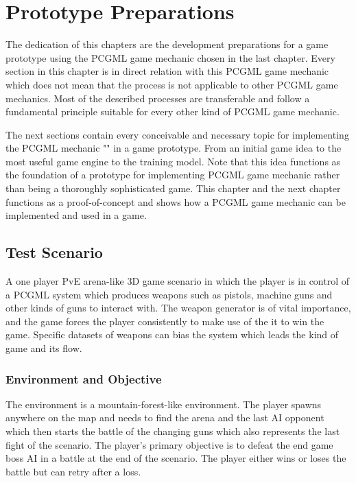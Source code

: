 \documentclass[MGS,Master,english]{twbook}%
\begin{document}
%
%
\clearpage
\chapter{Prototype Preparations} \label{chapter::gamePrototype}
The dedication of this chapters are the development preparations for a game prototype using the PCGML game mechanic chosen in the last chapter. Every section in this chapter is in direct relation with this PCGML game mechanic which does not mean that the process is not applicable to other PCGML game mechanics. Most of the described processes are transferable and follow a fundamental principle suitable for every other kind of PCGML game mechanic. 

The next sections contain every conceivable and necessary topic for implementing the PCGML mechanic "" in a game prototype. From an initial game idea to the most useful game engine to the training model. Note that this idea functions as the foundation of a prototype for implementing PCGML game mechanic rather than being a thoroughly sophisticated game. This chapter and the next chapter functions as a proof-of-concept and shows how a PCGML game mechanic can be implemented and used in a game.

\section{Test Scenario}
A one player \ac{PvE} arena-like 3D game scenario in which the player is in control of a PCGML system which produces weapons such as pistols, machine guns and other kinds of guns to interact with. The weapon generator is of vital importance, and the game forces the player consistently to make use of the it to win the game. Specific datasets of weapons can bias the system which leads the kind of game and its flow. 

\subsection{Environment and Objective}
The environment is a mountain-forest-like environment. The player spawns anywhere on the map and needs to find the arena and the last AI opponent which then starts the battle of the changing guns which also represents the last fight of the scenario. The player's primary objective is to defeat the end game boss AI in a battle at the end of the scenario. The player either wins or loses the battle but can retry after a loss.
\end{document}
